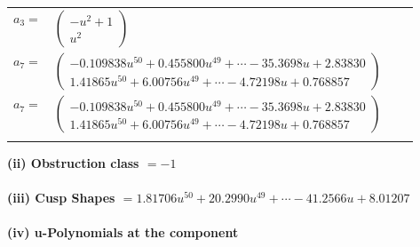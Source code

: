 \documentclass[1p]{elsarticle_modified}
\theoremstyle{definition}
\begin{document}
\begin{tabular}{m{7pt} m{180pt} m{7pt} m{180pt} }
\flushright $a_{3}=$&$\begin{pmatrix}- u^2+1\\u^2\end{pmatrix}$ \\
\flushright $a_{7}=$&$\begin{pmatrix}-0.109838 u^{50}+0.455800 u^{49}+\cdots-35.3698 u+2.83830\\1.41865 u^{50}+6.00756 u^{49}+\cdots-4.72198 u+0.768857\end{pmatrix}$\\ \flushright $a_{7}=$&$\begin{pmatrix}-0.109838 u^{50}+0.455800 u^{49}+\cdots-35.3698 u+2.83830\\1.41865 u^{50}+6.00756 u^{49}+\cdots-4.72198 u+0.768857\end{pmatrix}$\\&\end{tabular}
\flushleft \textbf{(ii) Obstruction class $= -1$}\\~\\
\flushleft \textbf{(iii) Cusp Shapes $= 1.81706 u^{50}+20.2990 u^{49}+\cdots-41.2566 u+8.01207$}\\~\\
\newpage\renewcommand{\arraystretch}{1}
\flushleft \textbf{(iv) u-Polynomials at the component}\newline \\
\end{document}

